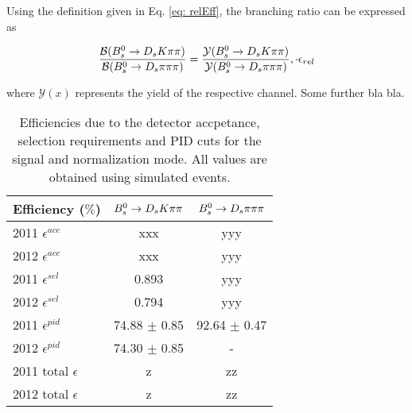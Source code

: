  Using the definition given in Eq. \ref{eq: relEff}, the branching ratio can be expressed as

\begin{equation}
\frac{\mathcal{B}({{B}^0_{s}}\rightarrow{\ensuremath{{D}_{s}}}{\ensuremath{K}}{\ensuremath{\pi}}{\ensuremath{\pi}})}{\mathcal{B}({{B}^0_{s}}\rightarrow{\ensuremath{{D}_{s}}}{\ensuremath{\pi}}{\ensuremath{\pi}}{\ensuremath{\pi}})} = \frac{\mathcal{Y}({{B}^0_{s}}\rightarrow{\ensuremath{{D}_{s}}}{\ensuremath{K}}{\ensuremath{\pi}}{\ensuremath{\pi}})}{\mathcal{Y}({{B}^0_{s}}\rightarrow{\ensuremath{{D}_{s}}}{\ensuremath{\pi}}{\ensuremath{\pi}}{\ensuremath{\pi}})},
\cdot \epsilon_{rel}
\label{eq: BRwEff}
\end{equation} 

where $\mathcal{Y}(x)$ represents the yield of the respective channel. \newline
Some further bla bla.

\begin{table}[h]
\centering
\begin{tabular}{l c c}
Efficiency ($\%$) & ${{B}^0_{s}}\rightarrow{\ensuremath{{D}_{s}}}{\ensuremath{K}}{\ensuremath{\pi}}{\ensuremath{\pi}}$ & ${{B}^0_{s}}\rightarrow{\ensuremath{{D}_{s}}}{\ensuremath{\pi}}{\ensuremath{\pi}}{\ensuremath{\pi}}$\\
\hline
2011 $\epsilon^{acc}$ & xxx & yyy\\
2012 $\epsilon^{acc}$ & xxx & yyy\\
2011 $\epsilon^{sel}$ & 0.893 & yyy\\
2012 $\epsilon^{sel}$ & 0.794 & yyy\\
2011 $\epsilon^{pid}$ & 74.88 $\pm$ 0.85 & 92.64 $\pm$ 0.47\\
2012 $\epsilon^{pid}$ & 74.30 $\pm$ 0.85 & -\\
\hline
2011 total $\epsilon$ & z & zz\\
2012 total $\epsilon$ & z & zz\\
\hline
\end{tabular}
\caption{Efficiencies due to the detector accpetance, selection requirements and PID cuts for the signal and normalization mode. All values are obtained using simulated events.}
\label{tab: effTab}
\end{table}





